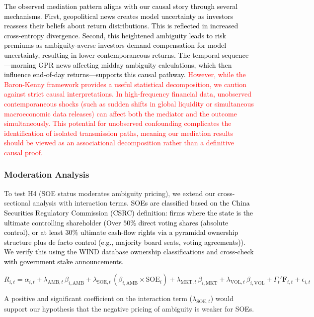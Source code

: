 \documentclass[preprint,12pt,authoryear]{elsarticle}
\begin{document}
\textcolor{black}{The observed mediation pattern aligns with our causal story through several mechanisms. First, geopolitical news creates model uncertainty as investors reassess their beliefs about return distributions. This is reflected in increased cross-entropy divergence. Second, this heightened ambiguity leads to risk premiums as ambiguity-averse investors demand compensation for model uncertainty, resulting in lower contemporaneous returns. The temporal sequence---morning GPR news affecting midday ambiguity calculations, which then influence end-of-day returns---supports this causal pathway.} \textcolor{red}{However, while the Baron-Kenny framework provides a useful statistical decomposition, we caution against strict causal interpretations. In high-frequency financial data, unobserved contemporaneous shocks (such as sudden shifts in global liquidity or simultaneous macroeconomic data releases) can affect both the mediator and the outcome simultaneously. This potential for unobserved confounding complicates the identification of isolated transmission paths, meaning our mediation results should be viewed as an associational decomposition rather than a definitive causal proof.}

\subsubsection{Moderation Analysis}

To test H4 (SOE status moderates ambiguity pricing), we extend our cross-sectional analysis with interaction terms. \textcolor{black}{SOEs are classified based on the China Securities Regulatory Commission (CSRC) definition: firms where the state is the ultimate controlling shareholder (Over $50\%$ direct voting shares (absolute control), or at least $30\%$ ultimate cash-flow rights via a pyramidal ownership structure plus de facto control (e.g., majority board seats, voting agreements)). We verify this using the WIND database ownership classifications and cross-check with government stake announcements.}

\begin{equation}
R_{i,t} = \alpha_{i,t} + \lambda_{\text{AMB},t} \, \beta_{i,\text{AMB}} + \lambda_{\text{SOE},t} \, (\beta_{i,\text{AMB}} \times \text{SOE}_i) + \lambda_{\text{MKT},t} \, \beta_{i,\text{MKT}} + \lambda_{\text{VOL},t} \, \beta_{i,\text{VOL}} + \Gamma_{t}' \mathbf{F}_{i,t} + \epsilon_{i,t}
\end{equation}

A positive and significant coefficient on the interaction term ($\lambda_{\text{SOE},t}$) would support our hypothesis that the negative pricing of ambiguity is weaker for SOEs.
\end{document}
